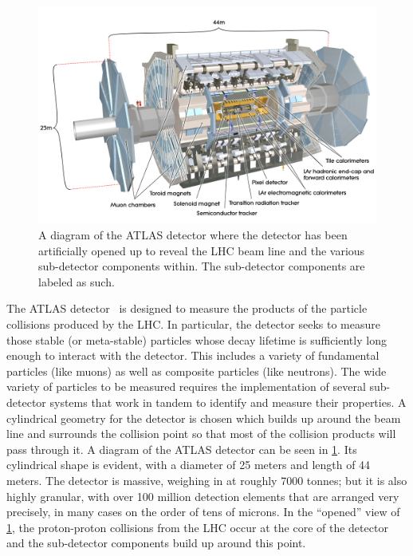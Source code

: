 

\begin{figure}[ht!]
\centering
\includegraphics[width=.95\textwidth]{figures/atlas/detector.jpg}
\caption{A diagram of the ATLAS detector where the detector has
been artificially opened up to reveal the LHC beam line and the
various sub-detector components within. The sub-detector components
are labeled as such.}
\label{fig:atlas}
\end{figure}

The ATLAS detector~\cite{ATLAS} is designed to measure
the products of the particle collisions produced by the LHC.
In particular, the detector seeks to measure those stable 
(or meta-stable) particles whose decay lifetime is sufficiently
long enough to interact with the detector.  This includes
a variety of fundamental particles (like muons) as well as 
composite particles (like neutrons). The wide variety of 
particles to be measured requires the implementation
of several sub-detector systems that work in tandem 
to identify and measure their properties. 
A cylindrical geometry for the detector is chosen
which builds up around the beam line and surrounds
the collision point so that most of the collision
products will pass through it.
A diagram of the ATLAS detector can be seen in \fig\ref{fig:atlas}.
Its cylindrical shape is evident, with a diameter of 25 meters
and length of 44 meters. The detector is massive, weighing
in at roughly 7000 tonnes; but it is also highly granular, with
over 100 million detection elements that are arranged very precisely, 
in many cases on the order of tens of microns.
In the ``opened'' view of \fig\ref{fig:atlas}, the proton-proton
collisions from the LHC occur at the core of the detector
and the sub-detector components build up around this point.

